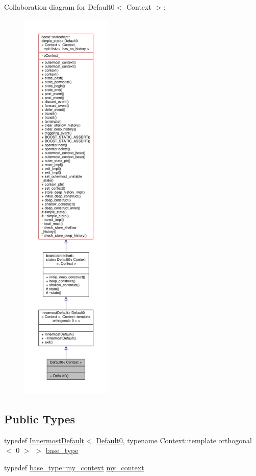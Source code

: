 Collaboration diagram for Default0$<$ Context $>$\+:
\nopagebreak
\begin{figure}[H]
\begin{center}
\leavevmode
\includegraphics[height=550pt]{struct_default0__coll__graph}
\end{center}
\end{figure}
\subsection*{Public Types}
\begin{DoxyCompactItemize}
\item 
typedef \mbox{\hyperlink{struct_innermost_default}{Innermost\+Default}}$<$ \mbox{\hyperlink{struct_default0}{Default0}}, typename Context\+::template orthogonal$<$ 0 $>$ $>$ \mbox{\hyperlink{struct_default0_a26b2b54fc496946980faa6e3736c68aa}{base\+\_\+type}}
\item 
typedef \mbox{\hyperlink{struct_innermost_default_a0aab337364dec3101e80f293b709d53d}{base\+\_\+type\+::my\+\_\+context}} \mbox{\hyperlink{struct_default0_abe729d763308952bd5df854e44ea8b81}{my\+\_\+context}}
\end{DoxyCompactItemize}
